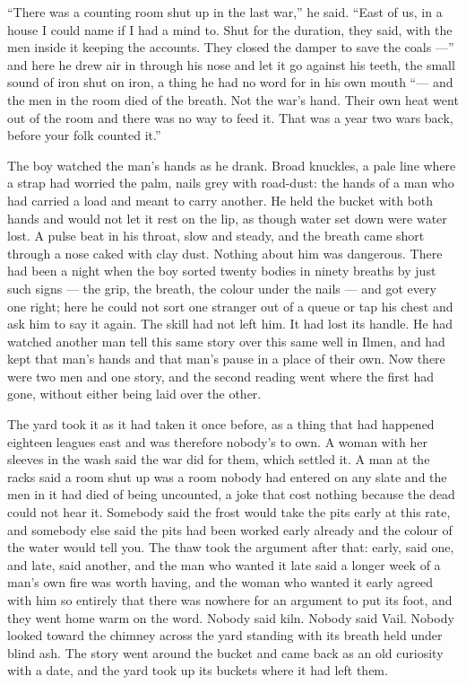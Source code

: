 “There was a counting room shut up in the last war,” he said. “East of us, in a house I could name if I had a mind to. Shut for the duration, they said, with the men inside it keeping the accounts. They closed the damper to save the coals ---” and here he drew air in through his nose and let it go against his teeth, the small sound of iron shut on iron, a thing he had no word for in his own mouth “--- and the men in the room died of the breath. Not the war's hand. Their own heat went out of the room and there was no way to feed it. That was a year two wars back, before your folk counted it.”

The boy watched the man's hands as he drank. Broad knuckles, a pale line where a strap had worried the palm, nails grey with road-dust: the hands of a man who had carried a load and meant to carry another. He held the bucket with both hands and would not let it rest on the lip, as though water set down were water lost. A pulse beat in his throat, slow and steady, and the breath came short through a nose caked with clay dust. Nothing about him was dangerous. There had been a night when the boy sorted twenty bodies in ninety breaths by just such signs --- the grip, the breath, the colour under the nails --- and got every one right; here he could not sort one stranger out of a queue or tap his chest and ask him to say it again. The skill had not left him. It had lost its handle. He had watched another man tell this same story over this same well in Ilmen, and had kept that man's hands and that man's pause in a place of their own. Now there were two men and one story, and the second reading went where the first had gone, without either being laid over the other.

The yard took it as it had taken it once before, as a thing that had happened eighteen leagues east and was therefore nobody's to own. A woman with her sleeves in the wash said the war did for them, which settled it. A man at the racks said a room shut up was a room nobody had entered on any slate and the men in it had died of being uncounted, a joke that cost nothing because the dead could not hear it. Somebody said the frost would take the pits early at this rate, and somebody else said the pits had been worked early already and the colour of the water would tell you. The thaw took the argument after that: early, said one, and late, said another, and the man who wanted it late said a longer week of a man's own fire was worth having, and the woman who wanted it early agreed with him so entirely that there was nowhere for an argument to put its foot, and they went home warm on the word. Nobody said kiln. Nobody said Vail. Nobody looked toward the chimney across the yard standing with its breath held under blind ash. The story went around the bucket and came back as an old curiosity with a date, and the yard took up its buckets where it had left them.

